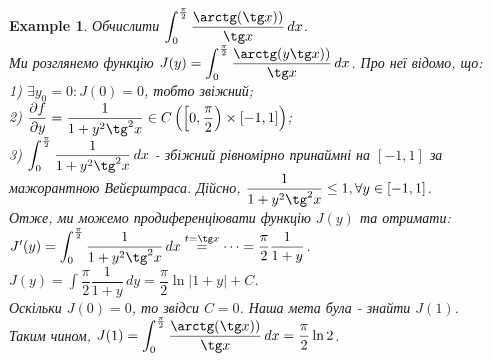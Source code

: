\documentclass[a4paper, 10pt]{article}
\def\departial#1#2{\dfrac{\partial {#1}}{\partial {#2}}}
\def\huge{\displaystyle}
\theoremstyle{theoremdd}
\theoremstyle{theoremdd}
\theoremstyle{theoremdd}
\theoremstyle{theoremdd}
\theoremstyle{theoremdd}
\newtheorem{example}[theorem]{Example}
\theoremstyle{theoremdd}
\theoremstyle{theoremdd}
\theoremstyle{theoremdd}
\theoremstyle{theoremdd}
\begin{document}
\begin{example}
Обчислити $\huge\int_0^{\frac{\pi}{2}} \dfrac{\arctg (\tg x))}{\tg x}\,dx$.\\
Ми розглянемо функцію $J(y) = \huge\int_0^{\frac{\pi}{2}} \dfrac{\arctg (y \tg x))}{\tg x}\,dx$. Про неї відомо, що:\\
1) $\exists y_0 = 0: J(0) = 0$, тобто звіжний;\\
2) $\departial{f}{y} = \dfrac{1}{1+y^2 \tg^2 x} \in C\left( \left[ 0, \dfrac{\pi}{2} \right) \times [-1,1] \right)$;\\
3) $\huge\int_0^{\frac{\pi}{2}} \dfrac{1}{1+y^2 \tg^2 x}\,dx$ - збіжний рівномірно принаймні на $[-1,1]$ за мажорантною Вейєрштраса. Дійсно, $\dfrac{1}{1+y^2 \tg^2 x} \leq 1, \forall y \in [-1,1]$.\\
Отже, ми можемо продиференціювати функцію $J(y)$ та отримати:\\
$J'(y) = \huge\int_0^{\frac{\pi}{2}} \dfrac{1}{1+y^2 \tg^2 x}\,dx \overset{t = \tg x}{=} \dots = \dfrac{\pi}{2} \dfrac{1}{1+y}$.\\
$J(y) = \huge\int \dfrac{\pi}{2} \dfrac{1}{1+y}\,dy = \dfrac{\pi}{2} \ln |1+y| + C$.\\
Оскільки $J(0) = 0$, то звідси $C = 0$. Наша мета була - знайти $J(1)$.\\
Таким чином, $J(1) = \huge\int_0^{\frac{\pi}{2}} \dfrac{\arctg (\tg x))}{\tg x}\,dx = \dfrac{\pi}{2} \ln 2$.
\end{example}
\end{document}
